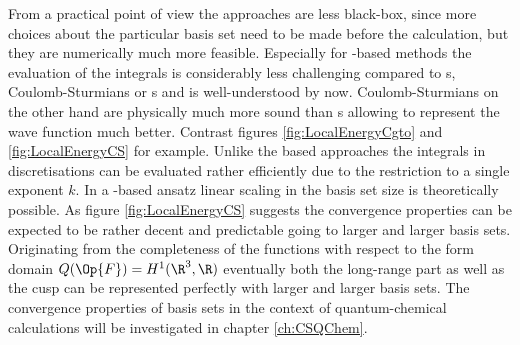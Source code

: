From a practical point of view
the \ACO approaches are less black-box,
since more choices about the particular basis set need to be made before the calculation,
but they are numerically much more feasible.
Especially for \cGTO-based methods the evaluation of the integrals
is considerably less challenging compared to {\STO}s, Coulomb-Sturmians
or {\FE}s and is well-understood by now.
Coulomb-Sturmians on the other hand are physically much more sound than
{\cGTO}s allowing to represent the wave function
much better.
Contrast figures \vref{fig:LocalEnergyCgto} and \vref{fig:LocalEnergyCS} for example.
Unlike the \STO based approaches
the integrals in \CS discretisations can be evaluated rather efficiently
due to the restriction to a single exponent $k$.
In a \contraction-based ansatz linear scaling in the basis set size
is theoretically possible.
As figure \ref{fig:LocalEnergyCS} suggests the convergence properties
can be expected to be rather decent and predictable
going to larger and larger basis sets.
Originating from the completeness of the \CS functions
with respect to the form domain $Q(\Op{F}) = H^1(\R^3,\R)$
eventually both the long-range part as well as the cusp can be represented
perfectly with larger and larger basis sets.
The convergence properties of \CS basis sets in the context of
quantum-chemical calculations will be investigated
in chapter \vref{ch:CSQChem}.
